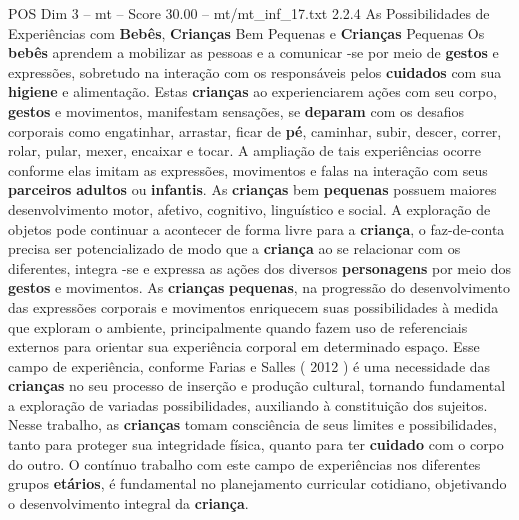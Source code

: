 \begin{textsample}{POS Dim 3 – mt – Score 30.00 – mt/mt\_inf\_17.txt}  \label{ex:f3_pos_073}
2.2.4 As Possibilidades de Experiências com \textbf{Bebês}, \textbf{Crianças} Bem Pequenas e \textbf{Crianças} Pequenas Os \textbf{bebês} aprendem a mobilizar as pessoas e a comunicar -se por meio de \textbf{gestos} e expressões, sobretudo na interação com os responsáveis pelos \textbf{cuidados} com sua \textbf{higiene} e alimentação.
Estas \textbf{crianças} ao experienciarem ações com seu corpo, \textbf{gestos} e movimentos, manifestam sensações, se \textbf{deparam} com os desafios corporais como engatinhar, arrastar, ficar de \textbf{pé}, caminhar, subir, descer, correr, rolar, pular, mexer, encaixar e tocar.
A ampliação de tais experiências ocorre conforme elas imitam as expressões, movimentos e falas na interação com seus \textbf{parceiros} \textbf{adultos} ou \textbf{infantis}.
As \textbf{crianças} bem \textbf{pequenas} possuem maiores desenvolvimento motor, afetivo, cognitivo, linguístico e social.
A exploração de objetos pode continuar a acontecer de forma livre para a \textbf{criança}, o faz-de-conta precisa ser potencializado de modo que a \textbf{criança} ao se relacionar com os diferentes, integra -se e expressa as ações dos diversos \textbf{personagens} por meio dos \textbf{gestos} e movimentos.
As \textbf{crianças} \textbf{pequenas}, na progressão do desenvolvimento das expressões corporais e movimentos enriquecem suas possibilidades à medida que exploram o ambiente, principalmente quando fazem uso de referenciais externos para orientar sua experiência corporal em determinado espaço.
Esse campo de experiência, conforme Farias e Salles ( 2012 ) é uma necessidade das \textbf{crianças} no seu processo de inserção e produção cultural, tornando fundamental a exploração de variadas possibilidades, auxiliando à constituição dos sujeitos.
Nesse trabalho, as \textbf{crianças} tomam consciência de seus limites e possibilidades, tanto para proteger sua integridade física, quanto para ter \textbf{cuidado} com o corpo do outro.
O contínuo trabalho com este campo de experiências nos diferentes grupos \textbf{etários}, é fundamental no planejamento curricular cotidiano, objetivando o desenvolvimento integral da \textbf{criança}.

\end{textsample}
